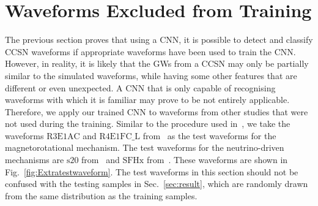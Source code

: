 \documentclass[aps,twocolumn,showpacs,groupedaddress, nofootinbib]{revtex4}  %
\begin{document}

\section{Waveforms Excluded from Training}\label{sec:unseen}
%
%
The previous section proves that using a \ac{CNN}, it is possible to detect and
classify \ac{CCSN} waveforms if appropriate waveforms have been used to train
the \ac{CNN}. However, in reality, it is likely that the \acp{GW} from a
\ac{CCSN} may only be partially similar to the simulated waveforms, while
having some other features that are different or even unexpected. A \ac{CNN}
that is only capable of recognising waveforms with which it is familiar may
prove to be not entirely applicable. Therefore, we apply our trained
\ac{CNN} to waveforms from other studies that were not used during the
training. Similar to the procedure used in~\cite{roma2019astrophysics}, we take
the waveforms $\text{R3E1AC}$ and $\text{R4E1FC\_L}$
from~\cite{scheidegger2010influence} as the test waveforms for the
magnetorotational mechanism. The test waveforms for the neutrino-driven
mechanisms are $\text{s}20$ from~\cite{andresen2017gravitational} and
$\text{SFHx}$ from~\cite{kuroda2016new}. These waveforms are shown
in Fig.~\ref{fig:Extratestwaveform}. The test waveforms in this section should
not be confused with the testing samples in Sec.~\ref{sec:result}, which are
randomly drawn from the same distribution as the training samples.
\end{document}
